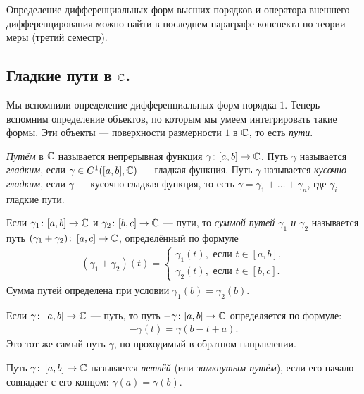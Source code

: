 \documentclass[../complex-analysis.tex]{subfiles}
\begin{document}
Определение дифференциальных форм высших порядков и оператора внешнего дифференцирования можно найти в последнем параграфе конспекта по теории меры (третий семестр).

\subsection{Гладкие пути в \texorpdfstring{$\mathbb{C}$}{комплексной плоскости}.}

Мы вспомнили определение дифференциальных форм порядка $1$. Теперь вспомним определение объектов, по которым мы умеем интегрировать такие формы. Эти объекты --- поверхности размерности $1$ в $\mathbb{C}$, то есть \textit{пути}.

\begin{df}[путь]
 \emph{Путём} в $\mathbb{C}$ называется непрерывная функция $\gamma \colon [a,b] \to \mathbb{C}$. Путь $\gamma$ называется \textit{гладким}, если $\gamma \in C^{1}([a,b],\mathbb{C})$ --- гладкая функция. Путь $\gamma$ называется \textit{кусочно-гладким}, если $\gamma$ --- кусочно-гладкая функция, то есть $\gamma = \gamma_1 + \ldots + \gamma_n$, где $\gamma_i$ --- гладкие пути.
\end{df}

\begin{df}
 Если $\gamma_1 \colon [a,b] \to \mathbb{C}$ и $\gamma_2 \colon [b,c] \to \mathbb{C}$ --- пути, то \textit{суммой путей $\gamma_1$ и $\gamma_2$} называется путь $(\gamma_1 + \gamma_2)\colon\, [a,c] \to \mathbb{C}$, определённый по формуле
 \begin{align*}
  (\gamma_1 + \gamma_2)(t) = \begin{cases}
   \gamma_1(t), \text{ если } t \in [a,b],  \\
   \gamma_2(t), \text{ если } t \in [b,c].
  \end{cases} 
 \end{align*} Сумма путей определена при условии $\gamma_1(b) = \gamma_2(b)$.
\end{df}

\begin{notatn}
 Если $\gamma \colon\, [a,b] \to \mathbb{C}$ --- путь, то путь $-\gamma \colon [a,b] \to \mathbb{C}$ определяется по формуле:
 \begin{align*}
  -\gamma(t) = \gamma(b - t + a).
 \end{align*} Это тот же самый путь $ \gamma $, но проходимый в обратном направлении.
\end{notatn}

\begin{df}
 Путь $ \gamma \colon\, [a,b]\to\mathbb{C} $ называется \emph{петлёй} (или \emph{замкнутым путём}), если его начало совпадает с его концом: $ \gamma(a)=\gamma(b) $.
\end{df}
\end{document}
